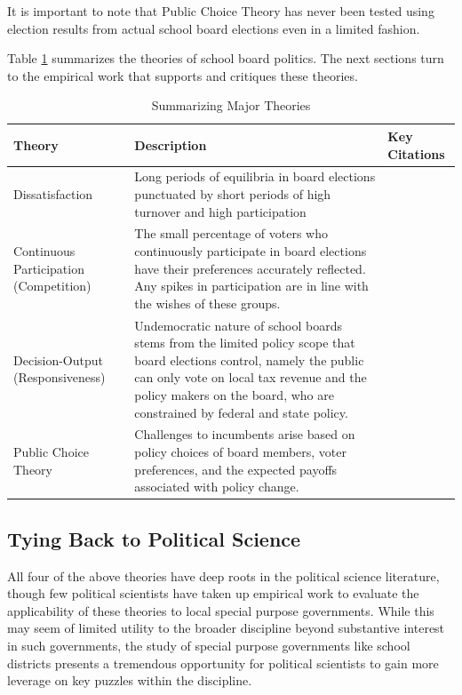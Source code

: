 It is important to note that Public Choice Theory has never been tested using election results from actual school board elections even in a limited fashion. 


Table \ref{sbtheory} summarizes the theories of school board politics. The next sections turn to the empirical work that supports and critiques these theories.

\begin{table}[h!]
\begin{center}
\begin{small}
\caption{Summarizing Major Theories}
\label{sbtheory}
\begin{tabular}{| p{} | p{} | p{} |}
\hline
\textbf{Theory}  & \textbf{Description} & \textbf{Key Citations} \\ \hline
Dissatisfaction  & Long periods of equilibria in board elections punctuated by 
short periods of high turnover and high participation & \citet{RefWorks:297,RefWorks:271} \\ \hline
Continuous Participation (Competition) &The small percentage of voters who continuously participate in board 
elections have their preferences accurately reflected. Any spikes in participation are in line
with the wishes of these groups. & \citet{RefWorks:281} \\ \hline
Decision-Output (Responsiveness) & Undemocratic nature of school boards stems from the limited policy scope that board elections
control, namely the public can only vote on local tax revenue and the policy makers on the board,
who are constrained by federal and state policy. & \citet{RefWorks:283} \\ \hline
Public Choice Theory &  Challenges to incumbents arise based on 
policy choices of board members, voter preferences, and the expected payoffs associated with policy change. & \citet{RefWorks:336, RefWorks:340,RefWorks:243} \\ \hline
\end{tabular}
\end{small}
\end{center}
\end{table}

\subsection{Tying Back to Political Science}
All four of the above theories have deep roots in the political science literature, though few political scientists have taken up empirical work to evaluate the applicability of these theories to local special purpose governments. While this may seem of limited utility to the broader discipline beyond substantive interest in such governments, the study of special purpose governments like school districts presents a tremendous opportunity for political scientists to gain more leverage on key puzzles within the discipline.   

